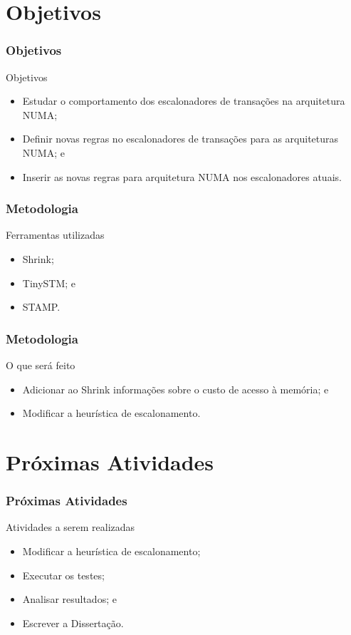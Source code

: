 \documentclass[10pt, pdf,xcolor=pdftex,dvipsnames,table]{beamer}
\begin{document}
\section{Objetivos}
\begin{frame} \frametitle{Objetivos}
\begin{block}{Objetivos}
\begin{itemize}
	\item Estudar o comportamento dos escalonadores de transações na arquitetura NUMA;
	\item Definir novas regras no escalonadores de transações para as arquiteturas NUMA; e
	\item Inserir as novas regras para arquitetura NUMA nos escalonadores atuais.
\end{itemize}
\end{block}
\end{frame}

\begin{frame} \frametitle{Metodologia}
    \begin{block}{Ferramentas utilizadas}
        \begin{itemize}
        	\item Shrink;
        	\item TinySTM; e
        	\item STAMP.
        \end{itemize}
    \end{block}
\end{frame}

\begin{frame} \frametitle{Metodologia}
\begin{block}{O que será feito}
\begin{itemize}
	\item Adicionar ao Shrink informações sobre o custo de acesso à memória; e
	\item Modificar a heurística de escalonamento.
\end{itemize}
\end{block}
\end{frame}

\section{Próximas Atividades}
\begin{frame} \frametitle{Próximas Atividades}
\begin{block}{Atividades a serem realizadas}
\begin{itemize}
	\item Modificar a heurística de escalonamento;
	\item Executar os testes;
	\item Analisar resultados; e
	\item Escrever a Dissertação.
\end{itemize}
\end{block}
\end{frame}
\end{document}
